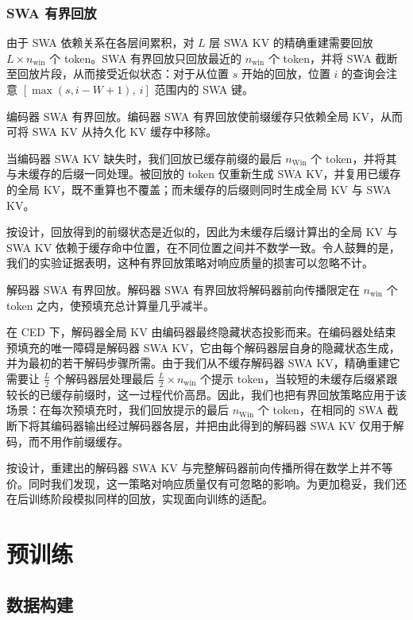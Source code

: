 \documentclass[
  10
]{article}
\begin{document}
\subsubsection{SWA 有界回放}\label{swa-bounded-replay}

由于 SWA 依赖关系在各层间累积，对 $L$ 层 SWA KV 的精确重建需要回放 \(L \times n _ { \mathrm { w i n } }\) 个 token。SWA 有界回放只回放最近的 \(n _ { \mathrm { { w i n } } }\) 个 token，并将 SWA 截断至回放片段，从而接受近似状态：对于从位置 $s$ 开始的回放，位置 $i$ 的查询会注意 $[\max(s, i - W + 1),\ i]$ 范围内的 SWA 键。

编码器 SWA 有界回放。编码器 SWA 有界回放使前缀缓存只依赖全局 KV，从而可将 SWA KV 从持久化 KV 缓存中移除。

当编码器 SWA KV 缺失时，我们回放已缓存前缀的最后 \(n _ { \mathrm { W i n } }\) 个 token，并将其与未缓存的后缀一同处理。被回放的 token 仅重新生成 SWA KV，并复用已缓存的全局 KV，既不重算也不覆盖；而未缓存的后缀则同时生成全局 KV 与 SWA KV。

按设计，回放得到的前缀状态是近似的，因此为未缓存后缀计算出的全局 KV 与 SWA KV 依赖于缓存命中位置，在不同位置之间并不数学一致。令人鼓舞的是，我们的实验证据表明，这种有界回放策略对响应质量的损害可以忽略不计。

解码器 SWA 有界回放。解码器 SWA 有界回放将解码器前向传播限定在 \(n _ { \mathrm { w i n } }\) 个 token 之内，使预填充总计算量几乎减半。

在 CED 下，解码器全局 KV 由编码器最终隐藏状态投影而来。在编码器处结束预填充的唯一障碍是解码器 SWA KV，它由每个解码器层自身的隐藏状态生成，并为最初的若干解码步骤所需。由于我们从不缓存解码器 SWA KV，精确重建它需要让 \(\frac { L } { 2 }\) 个解码器层处理最后 \(\frac { L } { 2 } \times n _ { \mathrm { w i n } }\) 个提示 token，当较短的未缓存后缀紧跟较长的已缓存前缀时，这一过程代价高昂。因此，我们也把有界回放策略应用于该场景：在每次预填充时，我们回放提示的最后 \(n _ { \mathrm { W i n } }\) 个 token，在相同的 SWA 截断下将其编码器输出经过解码器各层，并把由此得到的解码器 SWA KV 仅用于解码，而不用作前缀缓存。

按设计，重建出的解码器 SWA KV 与完整解码器前向传播所得在数学上并不等价。同时我们发现，这一策略对响应质量仅有可忽略的影响。为更加稳妥，我们还在后训练阶段模拟同样的回放，实现面向训练的适配。

\section{预训练}\label{pre-training}

\subsection{数据构建}\label{data-construction}
\end{document}
